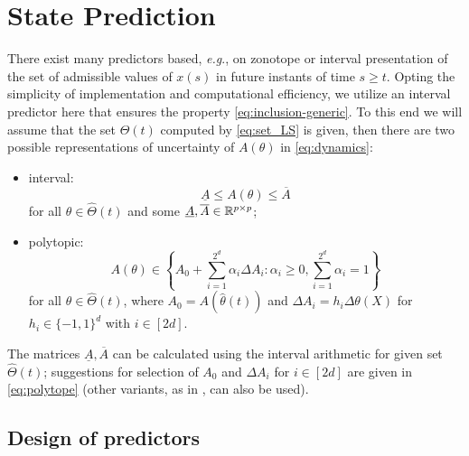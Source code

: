 \documentclass[letterpaper, 10 pt, conference]{ieeeconf}  %
\begin{document}
\section{\label{sec:prediction} State Prediction}

There exist many predictors based, \emph{e.g}., on zonotope \cite{le2012}
or interval \cite{Dinh2014,leurent2019interval} presentation of the
set of admissible values of $x(s)$ in future instants of time $s\geq t$.
Opting the simplicity of implementation and computational efficiency,
we utilize an interval predictor here that ensures the property \eqref{eq:inclusion-generic}.
To this end we will assume that the set $\hat{\Theta}(t)$ computed
by \eqref{eq:set_LS} is given, then there are two possible representations
of uncertainty of $A(\theta)$ in \eqref{eq:dynamics}:
\begin{itemize}
\item interval:
\begin{equation}
\underline{A}\leq A(\theta)\leq\overline{A}\label{eq:interval}
\end{equation}
for all $\theta\in\hat{\Theta}(t)$ and some $\underline{A},\overline{A}\in\mathbb{R}^{p\times p}$;
\item polytopic:
\begin{equation}
A(\theta)\in\left\{ A_{0}+\sum_{i=1}^{2^{d}}\alpha_{i}\Delta A_{i}:\alpha_{i}\geq0,\sum_{i=1}^{2^{d}}\alpha_{i}=1\right\} \label{eq:polytope}
\end{equation}
for all $\theta\in\hat{\Theta}(t)$, where $A_{0}=A(\hat{\theta}(t))$
and $\Delta A_{i}=h_{i}\Delta\theta(X)$ for $h_{i}\in\{-1,1\}^{d}$
with $i\in[2d]$.
\end{itemize}
The matrices $\underline{A},\overline{A}$ can be calculated using
the interval arithmetic for given set $\hat{\Theta}(t)$; suggestions
for selection of $A_{0}$ and $\Delta A_{i}$ for $i\in[2d]$ are
given in \eqref{eq:polytope} (other variants, as in \cite{delos2015},
can also be used).

\subsection{Design of predictors}
\end{document}
